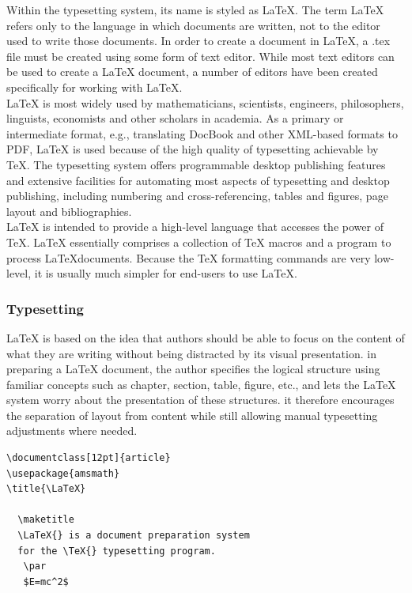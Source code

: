 \hspace{-1.8em} Within the typesetting system, its name is styled as \LaTeX. The term 
\LaTeX{} refers only to the language in which documents are written, 
not to the editor used to write those documents. In order to create a 
document in \LaTeX, a .tex file must be created using some form of text 
editor. While most text editors can be used to create a \LaTeX{} document, 
a number of editors have been created specifically for working with \LaTeX.\\

\noindent\LaTeX{} is most widely used by mathematicians, scientists, 
engineers, philosophers, linguists, economists and other scholars in 
academia. As a primary or intermediate format, e.g., translating DocBook 
and other XML-based formats to PDF, \LaTeX{} is used because of the 
high quality of typesetting achievable by \TeX. The typesetting system 
offers programmable desktop publishing features and extensive facilities 
for automating most aspects of typesetting and desktop publishing, 
including numbering and cross-referencing, tables and figures, 
page layout and bibliographies.\\

\noindent\LaTeX{} is intended to provide a high-level language that
accesses the power of \TeX. \LaTeX{} essentially comprises a
collection of \TeX{} macros and a program to process \LaTeX documents. 
Because the \TeX{} formatting commands are very low-level, it is usually 
much simpler for end-users to use \LaTeX{}.


\subsubsection{Typesetting}
\LaTeX{} is based on the idea that authors should be able to focus on 
the content of what they are writing without being distracted by its 
visual presentation. in preparing a \LaTeX{} document, the author 
specifies the logical structure using familiar concepts such as 
chapter, section, table, figure, etc., and lets the \LaTeX{} system 
worry about the presentation of these structures. it therefore 
encourages the separation of layout from content while still allowing 
manual typesetting adjustments where needed. 

\begin{verbatim}
\documentclass[12pt]{article}
\usepackage{amsmath}
\title{\LaTeX}

  \maketitle 
  \LaTeX{} is a document preparation system 
  for the \TeX{} typesetting program.
   \par 
   $E=mc^2$

\end{verbatim}


